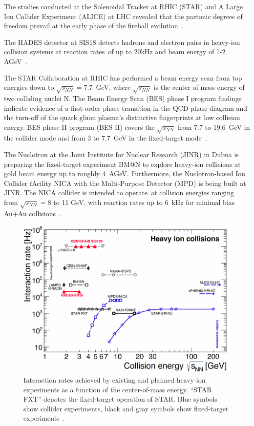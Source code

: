 The studies conducted at the Solenoidal Tracker at \gls{RHIC} (\gls{STAR}) and A Large Ion Collider Experiment (\gls{ALICE}) at \gls{LHC} revealed that the partonic degrees of freedom prevail at the early phase of the fireball evolution~\cite{CBM_physics}.

The HADES detector at SIS18 detects hadrons and electron pairs in heavy-ion collision systems at reaction rates of up to 20kHz and beam energy of 1-2 AGeV~\cite{Ablyazimov_2017}.


The STAR Collaboration at \gls{RHIC} has
performed a beam energy scan from top energies down
to $\sqrt{s_{NN}} = 7.7$~GeV, where $\sqrt{s_{NN}}$ is the center of mass energy of two colliding nuclei N.  The Beam Energy Scan (\gls{BES}) phase I program findings indicate evidence of a first-order phase transition in the QCD phase diagram and the turn-off of the quark gluon plasma's distinctive fingerprints at low collision energy. BES phase II program (BES II) covers the $\sqrt{s_{NN}}$ from 7.7 to 19.6~GeV in the collider mode and from 3 to 7.7~GeV in the fixed-target mode~\cite{STAR2, STAR1}.

The Nuclotron at the Joint Institute for Nuclear Research (JINR) in Dubna is preparing the fixed-target experiment BM@N to explore heavy-ion collisions at gold beam energy up to roughly 4~AGeV. Furthermore, the Nuclotron-based Ion Collider fAcility NICA with the Multi-Purpose Detector (MPD) is being built at JINR. The NICA collider is intended to operate at collision energies ranging from $\sqrt{s_{NN}} = 8$ to 11 GeV, with reaction rates up to 6~kHz for minimal bias Au+Au collisions~\cite{Ablyazimov_2017}.

\begin{figure}[!h]
    \centering
    \includegraphics[width=0.7\columnwidth]{Chapter1/images/interaction_rates.png}
    \caption{Interaction rates achieved by existing and planned heavy-ion experiments as a function of the center-of-mass energy. “STAR FXT” denotes the fixed-target operation of STAR.  Blue symbols show collider experiments, black and gray symbols show fixed-target experiments~\cite{Ablyazimov_2017}.}
    \label{fig:cbm_rates}
\end{figure}





